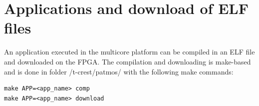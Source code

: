 \documentclass[a4paper,fontsize=10pt,twoside,DIV15,BCOR12mm,headinclude=true,footinclude=false,pagesize,bibtotoc]{scrbook}
\newcommand{\code}[1]{{\texttt{#1}}}
\newcommand{\comment}[3]{

\textsf{\textbf{#1}} {\color{#3}#2}}
\newcommand{\martin}[1]{\comment{Martin}{#1}{Blue}}
\begin{document}
\section{Applications and download of ELF files}

An application executed in the multicore platform can be compiled in an ELF file and downloaded on the FPGA.
The compilation and downloading
is make-based and is done in folder /t-crest/patmos/ with the following make commands:

\begin{verbatim}
make APP=<app_name> comp
make APP=<app_name> download
\end{verbatim}


%
%
%
%
%
%
%
%
\end{document}
